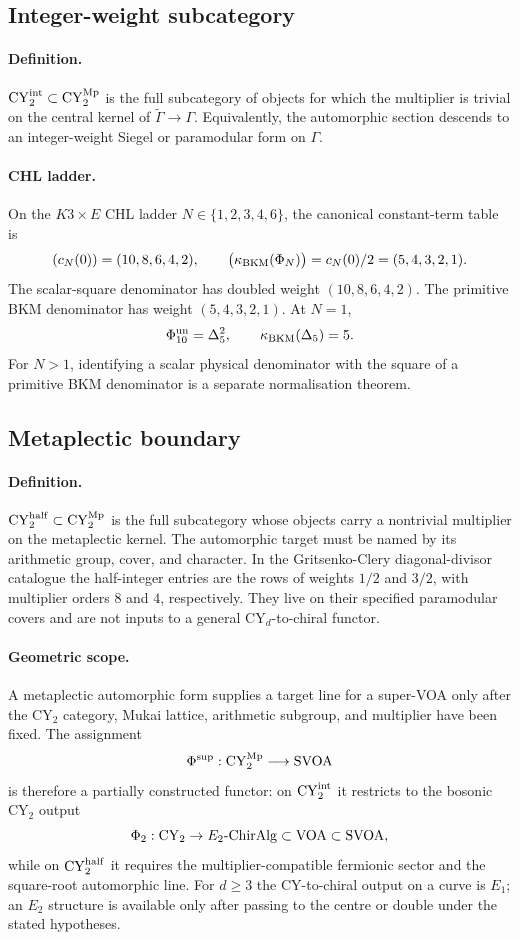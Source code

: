 \subsection*{Integer-weight subcategory}

\paragraph{Definition.}
\(\mathrm{CY}_2^{\mathrm{int}}\subset\mathrm{CY}_2^{\mathrm{Mp}}\) is the full subcategory of objects for which the
multiplier is trivial on the central kernel of
\(\widetilde{\Gamma}\to\Gamma\).  Equivalently, the automorphic section
descends to an integer-weight Siegel or paramodular form on \(\Gamma\).

\paragraph{CHL ladder.}
On the \(K3\times E\) CHL ladder \(N\in\{1,2,3,4,6\}\), the canonical
constant-term table is
\[
  (c_N(0))=(10,8,6,4,2),
  \qquad
  \bigl(\kappa_{\mathrm{BKM}}(\Phi_N)\bigr)
  =c_N(0)/2=(5,4,3,2,1).
\]
The scalar-square denominator has doubled weight
\((10,8,6,4,2)\).  The primitive BKM denominator has weight
\((5,4,3,2,1)\).  At \(N=1\),
\[
  \Phi_{10}^{\mathrm{un}}=\Delta_5^2,
  \qquad
  \kappa_{\mathrm{BKM}}(\Delta_5)=5.
\]
For \(N>1\), identifying a scalar physical denominator with the square
of a primitive BKM denominator is a separate normalisation theorem.

\subsection*{Metaplectic boundary}

\paragraph{Definition.}
\(\mathrm{CY}_2^{\mathrm{half}}\subset\mathrm{CY}_2^{\mathrm{Mp}}\) is the full subcategory whose objects carry a
nontrivial multiplier on the metaplectic kernel.  The automorphic target
must be named by its arithmetic group, cover, and character.  In the
Gritsenko-Clery diagonal-divisor catalogue the half-integer entries are
the rows of weights \(1/2\) and \(3/2\), with multiplier orders \(8\)
and \(4\), respectively.  They live on their specified paramodular
covers and are not inputs to a general CY\(_d\)-to-chiral functor.

\paragraph{Geometric scope.}
A metaplectic automorphic form supplies a target line for a super-VOA
only after the CY\(_2\) category, Mukai lattice, arithmetic subgroup,
and multiplier have been fixed.  The assignment
\[
  \Phi^{\mathrm{sup}}:\mathrm{CY}_2^{\mathrm{Mp}}\longrightarrow\mathrm{SVOA}
\]
is therefore a partially constructed functor: on \(\mathrm{CY}_2^{\mathrm{int}}\) it restricts
to the bosonic CY\(_2\) output
\[
  \Phi_2:\mathrm{CY}_2\to E_2\text{-}\mathrm{ChirAlg}\subset\mathrm{VOA}\subset\mathrm{SVOA},
\]
while on \(\mathrm{CY}_2^{\mathrm{half}}\) it requires the multiplier-compatible fermionic
sector and the square-root automorphic line.  For \(d\ge3\) the
CY-to-chiral output on a curve is \(E_1\); an \(E_2\) structure is
available only after passing to the centre or double under the stated
hypotheses.

